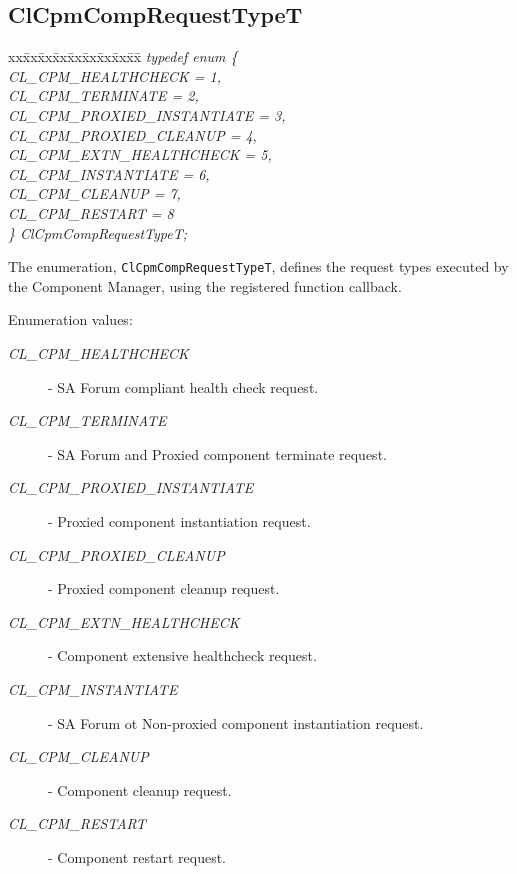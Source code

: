 {\subsection{ClCpmCompRequestTypeT}
\begin{tabbing}
 xx\=xx\=xx\=xx\=xx\=xx\=xx\=xx\=xx\=\kill
\textit{typedef enum \{}\\
\>\>\>\>\textit{CL\_CPM\_HEALTHCHECK = 1,}\\
\>\>\>\>\textit{CL\_CPM\_TERMINATE = 2,}\\
\>\>\>\>\textit{CL\_CPM\_PROXIED\_INSTANTIATE = 3,}\\
\>\>\>\>\textit{CL\_CPM\_PROXIED\_CLEANUP = 4,}\\
\>\>\>\>\textit{CL\_CPM\_EXTN\_HEALTHCHECK = 5,}\\
\>\>\>\>\textit{CL\_CPM\_INSTANTIATE = 6,}\\
\>\>\>\>\textit{CL\_CPM\_CLEANUP = 7,}\\
\>\>\>\>\textit{CL\_CPM\_RESTART = 8}\\
\textit{\} ClCpmCompRequestTypeT;}\\
\end{tabbing}
The enumeration, {\tt{ClCpmCompRequestTypeT}}, defines the request types executed by the Component Manager, using the registered function callback. \begin{Desc}
\item[Enumeration values: ]\par
\begin{description}
\item[{\em CL\_\-CPM\_\-HEALTHCHECK}] - SA Forum compliant health check request. 
\item[{\em CL\_\-CPM\_\-TERMINATE}] - SA Forum and Proxied component terminate request. 
\item[{\em CL\_\-CPM\_\-PROXIED\_\-INSTANTIATE}] - Proxied component instantiation request. 
\item[{\em CL\_\-CPM\_\-PROXIED\_\-CLEANUP}] - Proxied component cleanup request. 
\item[{\em CL\_\-CPM\_\-EXTN\_\-HEALTHCHECK}] - Component extensive healthcheck request. 
\item[{\em CL\_\-CPM\_\-INSTANTIATE}] - SA Forum ot Non-proxied component instantiation request. 
\item[{\em CL\_\-CPM\_\-CLEANUP}] - Component cleanup request. 
\item[{\em CL\_\-CPM\_\-RESTART}] - Component restart request. 
\end{description}
\end{Desc}

}
